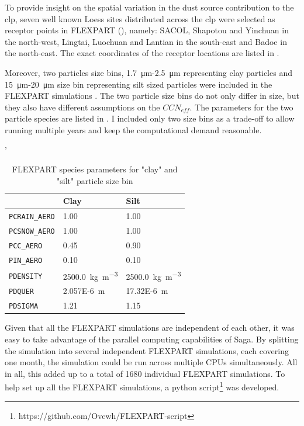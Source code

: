 To provide insight on the spatial variation in the dust source contribution to the \acrshort{clp}, seven well known Loess sites distributed across the \acrshort{clp} were selected as receptor points in FLEXPART  (), namely: SACOL, Shapotou and Yinchuan in the north-west, Lingtai, Luochuan and Lantian in the south-east and Badoe in the north-east. 
The exact coordinates of the receptor locations are listed in . 



Moreover, two particles size bins, \SI{1.7}{\micro\metre}-\SI{2.5}{\micro\metre} representing clay particles and  \SI{15}{\micro\metre}-\SI{20}{\micro\metre} size bin representing silt sized particles were included in the FLEXPART simulations . 
The two particle size bins do not only differ in size, but they also have different assumptions on the $CCN_{eff}$. 
The parameters for the two particle species are listed in . 
I included only two size bins as a trade-off to allow running multiple years and keep the computational demand reasonable.  
 
\begin{table}[htpb]
\caption{FLEXPART species parameters for "clay" and "silt" particle size bin}
\label{tab:particle_params}'
\centering
\begin{tabular}{@{}lll@{}}
\toprule
 & Clay  & Silt \\ \midrule
\verb|PCRAIN_AERO| & 1.00  & 1.00 \\
\verb|PCSNOW_AERO| & 1.00  &  1.00 \\
\verb|PCC_AERO| & 0.45 \parencite{flexdust_ref_2016}   &  0.90\parencite{flexdust_ref_2016} \\
\verb|PIN_AERO| & 0.10 \parencite{flexdust_ref_2016} & 0.10 \parencite{flexdust_ref_2016} \\
\verb|PDENSITY| & \SI{2500.0}{\kg\per\cubic\metre}    & \SI{2500.0}{\kg\per\cubic\metre} \\
\verb|PDQUER| & \SI{2.057E-6}{\metre}    &  \SI{17.32E-6}{\metre}   \\
\verb|PDSIGMA| & 1.21   &  1.15    \\ \bottomrule
\end{tabular}%
\end{table}
 
Given that all the FLEXPART simulations are independent of each other, it was easy to take advantage of the parallel computing capabilities of Saga. By splitting the simulation into several independent FLEXPART simulations, each covering one month, the simulation could be run across multiple CPUs simultaneously.
All in all, this added up to a total of 1680 individual FLEXPART simulations.
To help set up all the FLEXPART simulations, a python script\footnote{https://github.com/Ovewh/FLEXPART-script} was developed. 

